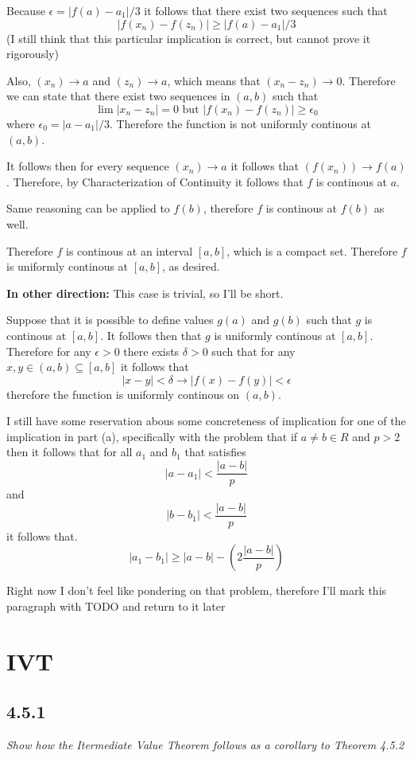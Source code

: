 \documentclass[11pt,oneside,titlepage]{book}
\begin{document}
Because $\epsilon = |f(a) - a_1| / 3$ it  follows that there exist
two sequences such that 
$$|f(x_n) - f(z_n)| \geq |f(a) - a_1| / 3$$
(I still think that this particular implication is correct, but cannot
prove it rigorously)

Also, $(x_n) \to a$ and $(z_n) \to a$, which means that
$(x_n - z_n) \to 0$. Therefore we can state that there exist two sequences in
$(a, b)$ such that 
$$\lim|x_n - z_n| = 0 \text{ but } |f(x_n) - f(z_n)| \geq \epsilon_0$$
where $\epsilon_0 = |a - a_1| / 3$. Therefore the function is not uniformly
continous at $(a, b)$.

It follows then for every sequence $(x_n) \to a$ it follows that
$(f(x_n)) \to f(a)$. Therefore, by Characterization of Continuity it follows
that $f$ is continous at $a$.

Same reasoning can be applied to $f(b)$, therefore $f$ is continous at
$f(b)$ as well.

Therefore $f$ is continous at an interval $[a, b]$, which is a compact set.
Therefore $f$ is uniformly continous at $[a, b]$, as desired.


\textbf{In other direction: }
This case is trivial, so I'll be short.

Suppose that it is possible to define values $g(a)$ and $g(b)$ such that
$g$ is continous at $[a, b]$. It follows then that $g$ is uniformly continous
at $[a, b]$. Therefore for any $\epsilon > 0$ there exists $\delta > 0$
such that for any $x, y \in (a, b) \subseteq [a, b]$
it follows that
$$|x - y| < \delta \to |f(x) - f(y)| < \epsilon$$
therefore the function is uniformly continous on $(a, b)$.

I still have some reservation abous some concreteness of implication for
one of the implication in part (a), specifically with
the problem that if $a \neq b \in R$ and $p > 2$  then it follows that
for all $a_1$ and $b_1$ that satisfies
$$|a - a_1| < \frac{|a - b|}{p}$$
and
$$|b - b_1| < \frac{|a - b|}{p}$$
it follows that.
$$|a_1 - b_1| \geq |a - b| - (2 \frac{|a - b|}{p})$$


Right now I don't feel like pondering on that problem, therefore I'll
mark this paragraph with TODO and return to it later

\section{IVT}

\subsection*{4.5.1}
\textit{Show how the Itermediate Value Theorem follows as a corollary
  to Theorem 4.5.2}
\end{document}
